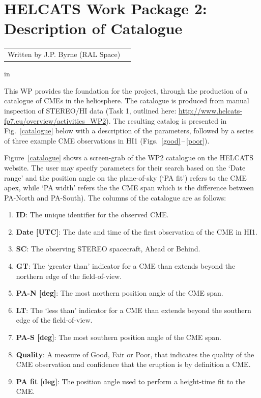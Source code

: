 \documentclass[10pt, a4paper, oneside]{article}
\begin{document}

\setcounter{page}{-1}






\section*{\sc \Large HELCATS Work Package 2: Description of Catalogue}

 
 \begin{center}
\begin{tabular}{ll}
\large Written by J.P. Byrne 	\hfill (RAL Space)
\end{tabular}
 \end{center}

 in



\setcounter{page}{1}



This WP provides the foundation for the project, through the production of a catalogue of CMEs in the heliosphere. The catalogue is produced from manual inspection of STEREO/HI data (Task 1, outlined here: \href{http://www.helcats-fp7.eu/overview/activities_WP2}{http://www.helcats-fp7.eu/overview/activities\_WP2}). The resulting catalog is presented in Fig.~\ref{catalogue} below with a description of the parameters, followed by a series of three example CME observations in HI1 (Figs.~\ref{good}\,--\,\ref{poor}). 

Figure~\ref{catalogue} shows a screen-grab of the WP2 catalogue on the HELCATS website. The user may specify parameters for their search based on the `Date range' and the position angle on the plane-of-sky (`PA fit') refers to the CME apex, while `PA width' refers the the CME span which is the difference between PA-North and PA-South). The columns of the catalogue are as follows:

\begin{enumerate}
\item {\bf ID}: The unique identifier for the observed CME.
\item {\bf Date [UTC]}: The date and time of the first observation of the CME in HI1.
\item {\bf SC}: The observing STEREO spacecraft, Ahead or Behind.
\item {\bf GT}: The `greater than' indicator for a CME than extends beyond the northern edge of the field-of-view.
\item {\bf PA-N [deg]}: The most northern position angle of the CME span.
\item {\bf LT}: The `less than' indicator for a CME than extends beyond the southern edge of the field-of-view.
\item {\bf PA-S [deg]}: The most southern position angle of the CME span.
\item {\bf Quality}: A measure of Good, Fair or Poor, that indicates the quality of the CME observation and confidence that the eruption is by definition a CME.
\item {\bf PA fit [deg]}: The position angle used to perform a height-time fit to the CME.
\end{enumerate}
\end{document}
